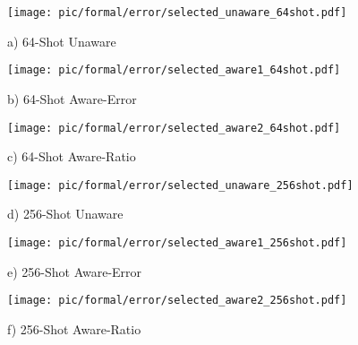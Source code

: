 \begin{figure}[ht]
    \centering
    \begin{minipage}[t]{0.28\textwidth}
        \centering
        \texttt{[image: pic/formal/error/selected\_unaware\_64shot.pdf]}
        \caption*{a) 64-Shot Unaware}
    \end{minipage}
    \hfill
    \begin{minipage}[t]{0.28\textwidth}
        \centering
        \texttt{[image: pic/formal/error/selected\_aware1\_64shot.pdf]}
        \caption*{b) 64-Shot Aware-Error}
    \end{minipage}
    \hfill
    \begin{minipage}[t]{0.4\textwidth}
        \centering
        \texttt{[image: pic/formal/error/selected\_aware2\_64shot.pdf]}
        \caption*{c) 64-Shot Aware-Ratio}
    \end{minipage}
    
    \vspace{1em} %
    
    \begin{minipage}[t]{0.28\textwidth}
        \centering
        \texttt{[image: pic/formal/error/selected\_unaware\_256shot.pdf]}
        \caption*{d) 256-Shot Unaware}
    \end{minipage}
    \hfill
    \begin{minipage}[t]{0.28\textwidth}
        \centering
        \texttt{[image: pic/formal/error/selected\_aware1\_256shot.pdf]}
        \caption*{e) 256-Shot Aware-Error}
    \end{minipage}
    \hfill
    \begin{minipage}[t]{0.4\textwidth}
        \centering
        \texttt{[image: pic/formal/error/selected\_aware2\_256shot.pdf]}
        \caption*{f) 256-Shot Aware-Ratio}
    \end{minipage}
    
    \vspace{1em} %
    

\end{figure}
